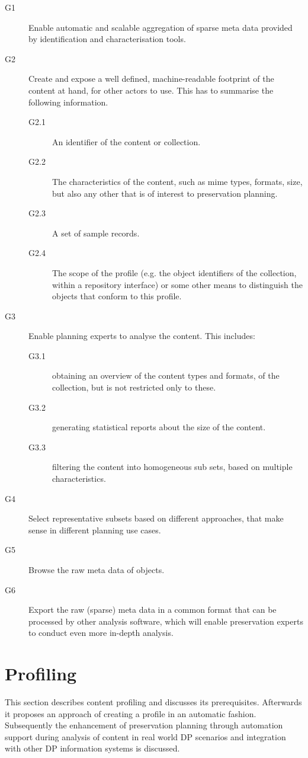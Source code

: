 \begin{description}
\item[G1] Enable automatic and scalable aggregation of sparse meta data provided by identification and characterisation tools.
\item[G2] Create and expose a well defined, machine-readable footprint of the content at hand, for other actors to use. This has to summarise the following information.
 \begin{description}
  \item[G2.1] An identifier of the content or collection.
  \item[G2.2] The characteristics of the content, such as mime types, formats, size, but also any other that is of interest to preservation planning.
  \item[G2.3] A set of sample records.
  \item[G2.4] The scope of the profile (e.g. the object identifiers of the collection, within a repository interface) or some other means to distinguish the objects that conform to this profile.
 \end{description}
\item[G3] Enable planning experts to analyse the content. This includes:
 \begin{description}
  \item[G3.1] obtaining an overview of the content types and formats, of the collection, but is not restricted only to these.
  \item[G3.2] generating statistical reports about the size of the content.
  \item[G3.3] filtering the content into homogeneous sub sets, based on multiple characteristics.
 \end{description}
\item[G4] Select representative subsets based on different approaches, that make sense in different planning use cases.
\item[G5] Browse the raw meta data of objects. 
\item[G6] Export the raw (sparse) meta data in a common format that can be processed by other analysis software, which will enable preservation experts to conduct even more in-depth analysis.
\end{description}

\section{Profiling}
\label{sec:content_profiling}
This section describes content profiling and discusses its prerequisites. Afterwards it proposes an approach of creating a profile in an automatic fashion. Subsequently the enhancement of preservation planning through automation support during analysis of content in real world DP scenarios and integration with other DP information systems is discussed.

